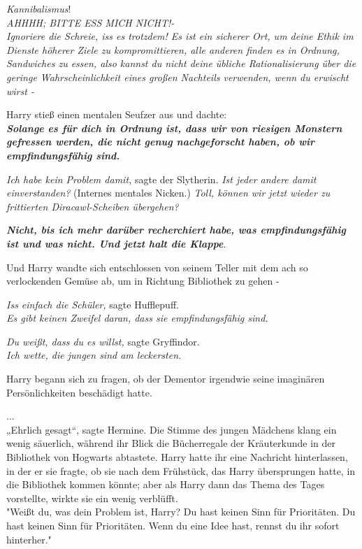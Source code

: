 {\emph{Kannibalismus}!\\ \emph{AHHHH; BITTE ESS MICH NICHT!-}\\ \emph{Ignoriere die Schreie, iss es trotzdem! Es ist ein sicherer Ort, um deine Ethik im Dienste höherer Ziele zu kompromittieren, alle anderen finden es in Ordnung, Sandwiches zu essen, also kannst du nicht deine übliche Rationalisierung über die geringe Wahrscheinlichkeit eines großen Nachteils verwenden, wenn du erwischt wirst -}

Harry stieß einen mentalen Seufzer aus und dachte:\\ \textbf{\emph{Solange es für dich in Ordnung ist, dass wir von riesigen Monstern gefressen werden, die nicht genug nachgeforscht haben, ob wir empfindungsfähig sind.}}

\emph{Ich habe kein Problem damit,} sagte der Slytherin. \emph{Ist jeder andere damit einverstanden?} (Internes mentales Nicken.) \emph{Toll, können wir jetzt wieder zu frittierten Diracawl-Scheiben übergehen?}

\textbf{\emph{Nicht, bis ich mehr darüber recherchiert habe, was empfindungsfähig ist und was nicht. Und jetzt halt die Klappe}}.

Und Harry wandte sich entschlossen von seinem Teller mit dem ach so verlockenden Gemüse ab, um in Richtung Bibliothek zu gehen -

\emph{Iss einfach die Schüler,} sagte Hufflepuff.\\ \emph{Es gibt keinen Zweifel daran, dass sie empfindungsfähig sind.}

\emph{Du weißt, dass du es willst,} sagte Gryffindor.\\ \emph{Ich wette, die jungen sind am leckersten.}

Harry begann sich zu fragen, ob der Dementor irgendwie seine imaginären Persönlichkeiten beschädigt hatte.

...\\ „Ehrlich gesagt“, sagte Hermine. Die Stimme des jungen Mädchens klang ein wenig säuerlich, während ihr Blick die Bücherregale der Kräuterkunde in der Bibliothek von Hogwarts abtastete. Harry hatte ihr eine Nachricht hinterlassen, in der er sie fragte, ob sie nach dem Frühstück, das Harry übersprungen hatte, in die Bibliothek kommen könnte; aber als Harry dann das Thema des Tages vorstellte, wirkte sie ein wenig verblüfft.\\ "Weißt du, was dein Problem ist, Harry? Du hast keinen Sinn für Prioritäten. Du hast keinen Sinn für Prioritäten. Wenn du eine Idee hast, rennst du ihr sofort hinterher."

}
